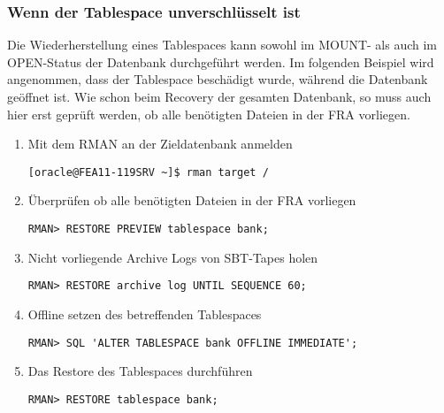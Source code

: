         \subsubsection{Wenn der Tablespace unverschlüsselt ist}
          Die Wiederherstellung eines Tablespaces kann sowohl im MOUNT- als auch im OPEN-Status der Datenbank durchgeführt werden. Im folgenden Beispiel wird angenommen, dass der Tablespace  beschädigt wurde, während die Datenbank geöffnet ist. Wie schon beim Recovery der gesamten Datenbank, so muss auch hier erst geprüft werden, ob alle benötigten Dateien in der FRA vorliegen.
          \begin{enumerate}
            \item Mit dem RMAN an der Zieldatenbank anmelden
              \begin{lstlisting}[caption={An der Zieldatenbank anmelden},label=admin1454,language=terminal]
[oracle@FEA11-119SRV ~]$ rman target /
              \end{lstlisting}
            \item Überprüfen ob alle benötigten Dateien in der FRA vorliegen
              \begin{lstlisting}[caption={Voraussetzungen überprüfen},label=admin1455,language=rman]
RMAN> RESTORE PREVIEW tablespace bank;
              \end{lstlisting}
            \item Nicht vorliegende Archive Logs von SBT-Tapes holen
              \begin{lstlisting}[caption={Voraussetzungen überprüfen},label=admin1456,language=rman]
RMAN> RESTORE archive log UNTIL SEQUENCE 60;
              \end{lstlisting}
            \item Offline setzen des betreffenden Tablespaces
              \begin{lstlisting}[caption={Betreffenden Tablespace Offline
              setzen},label=admin1457,language=rman,emph={[10]ALTER,TABLESPACE,OFFLINE,IMMEDIATE},emphstyle={[10]\color{magenta}\bfseries}]
RMAN> SQL 'ALTER TABLESPACE bank OFFLINE IMMEDIATE';
              \end{lstlisting}
            \item Das Restore des Tablespaces durchführen
              \begin{lstlisting}[caption={Restore des betreffenden Tablespaces},label=admin1458,language=rman]
RMAN> RESTORE tablespace bank;
              \end{lstlisting}

\end{enumerate}
